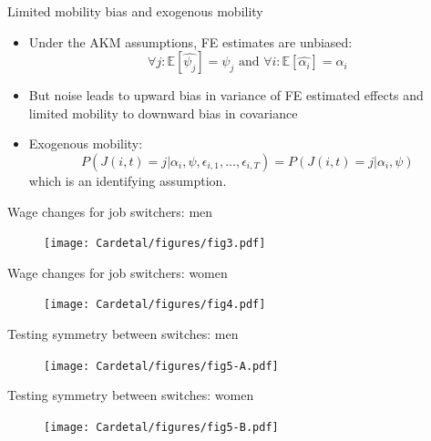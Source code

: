 \documentclass[notes=show]{beamer}
\begin{document}
\begin{frame}{Limited mobility bias and exogenous mobility}
\begin{itemize}
\item Under the AKM assumptions, FE estimates are unbiased:
    \begin{equation*}
	 \forall j: \mathbb{E} \left[ \hat{\psi_{j}} \right] = \psi_{j} \text{   and   }  \forall i: \mathbb{E} \left[ \hat{\alpha_{i}} \right] = \alpha_{i}
    \end{equation*}
\item But noise leads to upward bias in variance of FE estimated effects and limited mobility to downward bias in covariance \medskip
\item Exogenous mobility:
    \begin{equation*}
	P(J(i,t)=j | \alpha_{i}, \psi, \epsilon_{i,1},...,\epsilon_{i,T})=P(J(i,t)=j | \alpha_{i}, \psi)
    \end{equation*}
which is an identifying assumption.
\end{itemize}
\end{frame}

\newpage
\begin{frame}{Wage changes for job switchers: men}
\begin{center}
\begin{figure}
\texttt{[image: Cardetal/figures/fig3.pdf]}
\end{figure} 
\end{center}
\end{frame}

\newpage
\begin{frame}{Wage changes for job switchers: women}
\begin{center}
\begin{figure}
\texttt{[image: Cardetal/figures/fig4.pdf]}
\end{figure} 
\end{center}
\end{frame}

\newpage
\begin{frame}{Testing symmetry between switches: men}
\begin{center}
\begin{figure}
\texttt{[image: Cardetal/figures/fig5-A.pdf]}
\end{figure} 
\end{center}
\end{frame}

\newpage
\begin{frame}{Testing symmetry between switches: women}
\begin{center}
\begin{figure}
\texttt{[image: Cardetal/figures/fig5-B.pdf]}
\end{figure} 
\end{center}
\end{frame}
\end{document}
